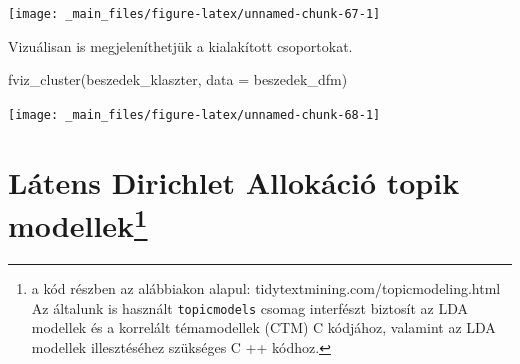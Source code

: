 \documentclass[
]{book}
\newenvironment{Shaded}{\begin{snugshade}}{\end{snugshade}}
\newcommand{\AttributeTok}[1]{\textcolor[rgb]{0.77,0.63,0.00}{#1}}
\newcommand{\FunctionTok}[1]{\textcolor[rgb]{0.00,0.00,0.00}{#1}}
\newcommand{\NormalTok}[1]{#1}
\begin{document}
\begin{center}\texttt{[image: \_main\_files/figure-latex/unnamed-chunk-67-1]} \end{center}

Vizuálisan is megjeleníthetjük a kialakított csoportokat.

\begin{Shaded}
\begin{Highlighting}[]
\FunctionTok{fviz\_cluster}\NormalTok{(beszedek\_klaszter, }\AttributeTok{data =}\NormalTok{ beszedek\_dfm)}
\end{Highlighting}
\end{Shaded}

\begin{center}\texttt{[image: \_main\_files/figure-latex/unnamed-chunk-68-1]} \end{center}

\hypertarget{luxe1tens-dirichlet-allokuxe1ciuxf3-topik-modellekklasztering_topicmodellek-2}{%
\section[Látens Dirichlet Allokáció topik
modellek]{\texorpdfstring{Látens Dirichlet Allokáció topik
modellek\footnote{a kód részben az alábbiakon alapul:
  tidytextmining.com/topicmodeling.html Az általunk is használt
  \texttt{topicmodels} csomag interfészt biztosít az LDA modellek és a
  korrelált témamodellek (CTM) C kódjához, valamint az LDA modellek
  illesztéséhez szükséges C ++ kódhoz.}}{Látens Dirichlet Allokáció topik modellek}}\label{luxe1tens-dirichlet-allokuxe1ciuxf3-topik-modellekklasztering_topicmodellek-2}}
\end{document}
